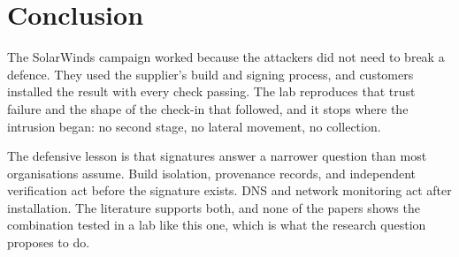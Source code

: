 \section{Conclusion}
\label{sec:conclusion}

The SolarWinds campaign worked because the attackers did not need to break a defence. They used the supplier's build and signing process, and customers installed the result with every check passing. The lab reproduces that trust failure and the shape of the check-in that followed, and it stops where the intrusion began: no second stage, no lateral movement, no collection.

The defensive lesson is that signatures answer a narrower question than most organisations assume. Build isolation, provenance records, and independent verification act before the signature exists. DNS and network monitoring act after installation. The literature supports both, and none of the papers shows the combination tested in a lab like this one, which is what the research question proposes to do.
